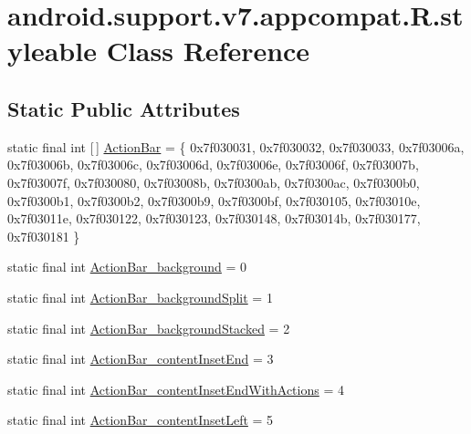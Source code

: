 \hypertarget{classandroid_1_1support_1_1v7_1_1appcompat_1_1R_1_1styleable}{}\section{android.\+support.\+v7.\+appcompat.\+R.\+styleable Class Reference}
\label{classandroid_1_1support_1_1v7_1_1appcompat_1_1R_1_1styleable}
\subsection*{Static Public Attributes}
\begin{DoxyCompactItemize}
\item 
static final int \mbox{[}$\,$\mbox{]} \mbox{\hyperlink{classandroid_1_1support_1_1v7_1_1appcompat_1_1R_1_1styleable_a5941dc15714398e9ec9afaa0155cc1cf}{Action\+Bar}} = \{ 0x7f030031, 0x7f030032, 0x7f030033, 0x7f03006a, 0x7f03006b, 0x7f03006c, 0x7f03006d, 0x7f03006e, 0x7f03006f, 0x7f03007b, 0x7f03007f, 0x7f030080, 0x7f03008b, 0x7f0300ab, 0x7f0300ac, 0x7f0300b0, 0x7f0300b1, 0x7f0300b2, 0x7f0300b9, 0x7f0300bf, 0x7f030105, 0x7f03010e, 0x7f03011e, 0x7f030122, 0x7f030123, 0x7f030148, 0x7f03014b, 0x7f030177, 0x7f030181 \}
\item 
static final int \mbox{\hyperlink{classandroid_1_1support_1_1v7_1_1appcompat_1_1R_1_1styleable_a9b51f8b4bd472a2d03b0839a309d3701}{Action\+Bar\+\_\+background}} = 0
\item 
static final int \mbox{\hyperlink{classandroid_1_1support_1_1v7_1_1appcompat_1_1R_1_1styleable_ab082a8a80c786208f65d64a76e5a6fe2}{Action\+Bar\+\_\+background\+Split}} = 1
\item 
static final int \mbox{\hyperlink{classandroid_1_1support_1_1v7_1_1appcompat_1_1R_1_1styleable_a35f9b7c13f145fbf00832637f16b0a28}{Action\+Bar\+\_\+background\+Stacked}} = 2
\item 
static final int \mbox{\hyperlink{classandroid_1_1support_1_1v7_1_1appcompat_1_1R_1_1styleable_ae23884da67e331c52fd10fe8cd2fcf68}{Action\+Bar\+\_\+content\+Inset\+End}} = 3
\item 
static final int \mbox{\hyperlink{classandroid_1_1support_1_1v7_1_1appcompat_1_1R_1_1styleable_a72dba036e2ecbaa6aed56d26793dd2ca}{Action\+Bar\+\_\+content\+Inset\+End\+With\+Actions}} = 4
\item 
static final int \mbox{\hyperlink{classandroid_1_1support_1_1v7_1_1appcompat_1_1R_1_1styleable_aab3f14d5994d10e0983e7554cde05482}{Action\+Bar\+\_\+content\+Inset\+Left}} = 5

\end{DoxyCompactItemize}
